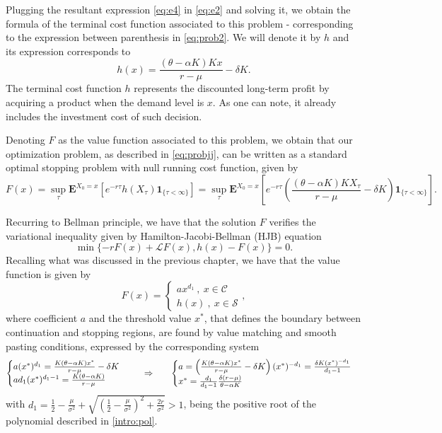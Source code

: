 Plugging the resultant expression \eqref{eq:e4} in \eqref{eq:e2} and solving it, we obtain the formula of the terminal cost function associated to this problem - corresponding to the expression between parenthesis in \eqref{eq:prob2}. We will denote it by $h$ and its expression corresponds to
\begin{equation}
h(x)=\frac{(\theta-\alpha K)K x}{r-\mu}- \delta K.
\label{prob1:h}
\end{equation}
The terminal cost function $h$ represents the discounted long-term profit by acquiring a product when the demand level is $x$. As one can note, it already includes the investment cost of such decision.
 
Denoting $F$ as the value function associated to this problem, we obtain that our optimization problem, as described in \eqref{eq:probjj}, can be written as a standard optimal stopping problem with null running cost function, given by
\begin{equation}
F(x)=\sup_\tau \textbf{E}^{X_0=x}\left[e^{-r\tau } h(X_\tau) \textbf{1}_{\{\tau<\infty\}} \right]=\sup_\tau \textbf{E}^{X_0=x}\left[e^{-r\tau } \left( \frac{(\theta-\alpha K)K X_\tau}{r-\mu}-\delta K \right) \textbf{1}_{\{\tau<\infty\}} \right].
\label{eq:prob3}
\end{equation}



Recurring to Bellman principle, we have that the solution $F$ verifies the variational inequality given by Hamilton-Jacobi-Bellman (HJB) equation
\begin{equation}
\min \{ -rF(x)+ \mathcal{L}F(x), h(x)-F(x) \} =0.
\label{eq:HJB}
\end{equation}
Recalling what was discussed in the previous chapter, we have that the value function is given by
$$F(x)=\begin{cases} a x^{d_1}  \ , \ x \in \mathcal{C} \\
h(x) \ , \ x \in \mathcal{S}
\end{cases},$$
where coefficient $a$ and the threshold value $x^*$, that defines the boundary between continuation and stopping regions, are found by value matching and smooth pasting conditions, expressed by the corresponding system
\begin{equation}
\begin{cases} a(x^*)^{d_1}=\frac{K(\theta-\alpha K) x^*}{r-\mu} - \delta K \\
ad_1(x^*)^{d_1-1}=\frac{K(\theta-\alpha K)}{r-\mu}
\end{cases}
\hspace{5mm} \Rightarrow \ \hspace{5mm}
\begin{cases}
a= \left( \frac{K(\theta-\alpha K) x^*}{r-\mu} - \delta K \right)(x^*)^{-d_1} = \frac{\delta K (x^*)^{-d_1}}{d_1-1}\\
x^*=\frac{d_1}{d_1-1} \frac{ \delta (r-\mu)}{\theta-\alpha K}
\end{cases}
\label{eq:sistema}
\end{equation}
with $d_1=\frac{1}{2}-\frac{\mu}{\sigma^2} +\sqrt{\left( \frac{1}{2} -\frac{\mu}{\sigma^2} \right) ^2+ \frac{2r}{\sigma^2}}>1$, being the positive root of the polynomial described in \eqref{intro:pol}.


